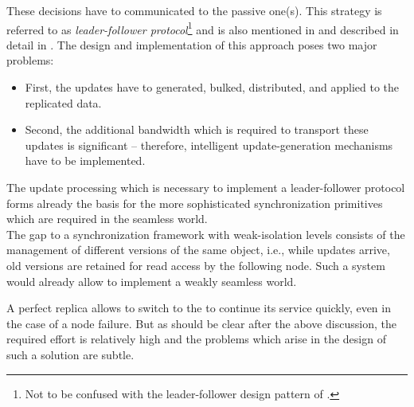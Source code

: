 \documentclass[a4paper, 10pt]{book}
\begin{document}
\begin{description}
\begin{description}
                            These decisions have to communicated to the passive one(s). This
                            strategy is referred to as \emph{leader-follower
                            protocol}\footnote{Not to be confused with the leader-follower
                            design pattern of \cite{schmidt00}.} and is also mentioned in
                            \cite{kopetz97} and described in detail in \cite{pow91}. 
                            The design and implementation of this approach poses two major
                            problems: 
                            \begin{itemize}
                                \item First, the updates have to generated, bulked, distributed, and
                                    applied to the replicated data. 
                                \item Second, the additional bandwidth which is required to
                                    transport these updates is significant -- therefore, intelligent
                                    update-generation mechanisms have to be implemented.
                            \end{itemize}
                            The update processing which is necessary to implement a
                            leader-follower protocol forms already the basis for the more
                            sophisticated synchronization primitives which are required in the
                            seamless world.\\
                            The gap to a synchronization framework with weak-isolation levels
                            consists of the management of different versions of the same object,
                            i.e., while updates arrive, old versions are retained for read
                            access by the following node. Such a system would already allow to
                            implement a weakly seamless world.
                    \end{description}
                    A perfect replica allows to switch to the \MMORG to continue its
                    service quickly, even in the case of a node failure. But as should
                    be clear after the above discussion, the required effort is
                    relatively high and the problems which arise in the design of such a
                    solution are subtle. 

\end{description}
\end{document}
